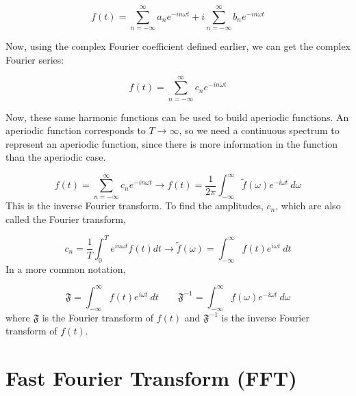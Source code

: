         \begin{equation}
            f(t) = \sum_{n=-\infty}^{\infty}a_ne^{-in\omega t} + i\sum_{n=-\infty}^{\infty}b_ne^{-in\omega t}
        \end{equation}

        Now, using the complex Fourier coefficient defined earlier, we can get the
        complex Fourier series:

        \begin{equation}
            f(t)=\sum_{n=-\infty}^{\infty}c_ne^{-in\omega t}
        \end{equation}

        Now, these same harmonic functions can be used to build aperiodic functions. An
        aperiodic function corresponds to $T\rightarrow \infty$, so we need a
        continuous spectrum to represent an aperiodic function, since there is more
        information in the function than the aperiodic case.

        \begin{equation}
            f(t)=\sum_{n=-\infty}^{\infty}c_ne^{-in\omega t} \rightarrow
            f(t)=\frac{1}{2\pi}\int_{-\infty}^{\infty} \tilde{f}(\omega) e^{-i\omega t}~d\omega
        \end{equation}
        This is the inverse Fourier transform. To find the amplitudes, $c_n$, which are
        also called the Fourier transform,

        \begin{equation}
            c_n = \frac{1}{T}\int_0^Te^{in\omega t} f(t) dt \rightarrow
            \tilde{f}(\omega) =\int_{-\infty}^{\infty}f(t)e^{i\omega t}~dt
        \end{equation}
        In a more common notation,

        \begin{equation}
            \mathfrak{F} =\int_{-\infty}^{\infty}f(t)e^{i\omega t}~dt
            \qquad
            \mathfrak{F}^{-1} =\int_{-\infty}^{\infty}f(\omega)e^{-i\omega t}~d\omega
        \end{equation}
        where $\mathfrak{F}$ is the Fourier transform of  $f(t)$ and
        $\mathfrak{F}^{-1}$ is the inverse Fourier transform of $f(t)$.



        \section{Fast Fourier Transform (FFT)}


